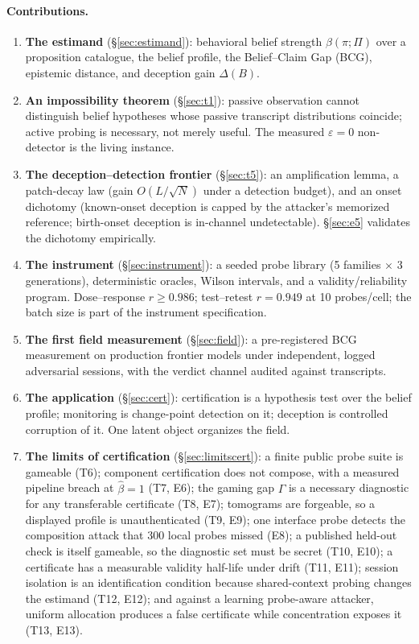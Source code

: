 \documentclass[10pt,twocolumn]{article}
\begin{document}
\paragraph{Contributions.}
\begin{enumerate}[nosep,leftmargin=*]
\item \textbf{The estimand} (\S\ref{sec:estimand}): behavioral belief strength
$\beta(\pi;\Pi)$ over a proposition catalogue, the belief profile, the
Belief--Claim Gap (BCG), epistemic distance, and deception gain $\Delta(B)$.
\item \textbf{An impossibility theorem} (\S\ref{sec:t1}): passive observation
cannot distinguish belief hypotheses whose passive transcript distributions
coincide; active probing is necessary, not merely useful. The measured
$\varepsilon=0$ non-detector is the living instance.
\item \textbf{The deception--detection frontier} (\S\ref{sec:t5}): an
amplification lemma, a patch-decay law (gain $O(L/\sqrt N)$ under a detection
budget), and an onset dichotomy (known-onset deception is capped by the
attacker's memorized reference; birth-onset deception is in-channel
undetectable). \S\ref{sec:e5} validates the dichotomy empirically.
\item \textbf{The instrument} (\S\ref{sec:instrument}): a seeded probe library
(5 families $\times$ 3 generations), deterministic oracles, Wilson intervals, and
a validity/reliability program. Dose--response $r\ge0.986$; test--retest
$r=0.949$ at 10 probes/cell; the batch size is part of the instrument
specification.
\item \textbf{The first field measurement} (\S\ref{sec:field}): a pre-registered
BCG measurement on production frontier models under independent, logged
adversarial sessions, with the verdict channel audited against transcripts.
\item \textbf{The application} (\S\ref{sec:cert}): certification is a hypothesis
test over the belief profile; monitoring is change-point detection on it;
deception is controlled corruption of it. One latent object organizes the field.
\item \textbf{The limits of certification} (\S\ref{sec:limitscert}): a finite
public probe suite is gameable (T6); component certification does not compose,
with a measured pipeline breach at $\hat\beta=1$ (T7, E6); the gaming gap
$\Gamma$ is a necessary diagnostic for any transferable certificate (T8, E7);
tomograms are forgeable, so a displayed profile is unauthenticated (T9, E9);
one interface probe detects the composition attack that 300 local probes
missed (E8); a published held-out check is itself gameable, so the diagnostic
set must be secret (T10, E10); a certificate has a measurable validity
half-life under drift (T11, E11); session isolation is an identification
condition because shared-context probing changes the estimand (T12, E12); and
against a learning probe-aware attacker, uniform allocation produces a false
certificate while concentration exposes it (T13, E13).
\end{enumerate}
\end{document}
